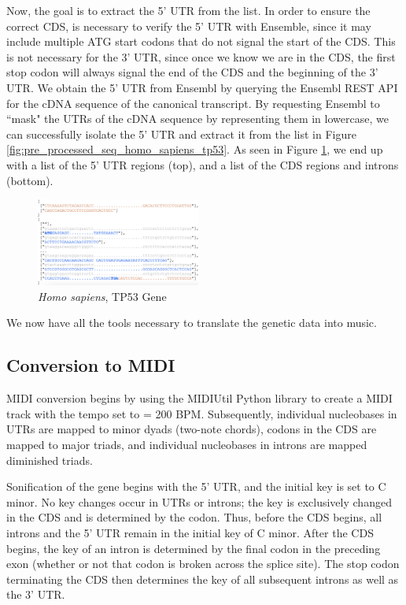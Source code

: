 \documentclass[letterpaper]{article}
\begin{document}
Now, the goal is to extract the 5' UTR from the list. In order to ensure the correct CDS, is necessary to verify the 5' UTR with Ensemble, since it may include multiple ATG start codons that do not signal the start of the CDS. This is not necessary for the 3' UTR, since once we know we are in the CDS, the first stop codon will always signal the end of the CDS and the beginning of the 3' UTR. We obtain the 5' UTR from Ensembl by querying the Ensembl REST API for the cDNA sequence of the canonical transcript. By requesting Ensembl to ``mask" the UTRs of the cDNA sequence by representing them in lowercase, we can successfully isolate the 5' UTR and extract it from the list in Figure \ref{fig:pre_processed_seq_homo_sapiens_tp53}. As seen in Figure \ref{fig:post_processed_seq_homo_sapiens_tp53}, we end up with a list of the 5' UTR regions (top), and a list of the CDS regions and introns (bottom).\cite{10.1162/artl_a_00325}

\begin{figure}[h!]
\centering
\includegraphics[width=0.48\textwidth]{images/post_processed_seq_homo_sapiens_tp53_ABBREV}
\vspace{-3mm}
  \caption{\textit{Homo sapiens}, TP53 Gene}\label{fig:post_processed_seq_homo_sapiens_tp53}
  \vspace{-3mm}
\end{figure}

We now have all the tools necessary to translate the genetic data into music.

\subsection{Conversion to MIDI}

MIDI conversion begins by using the MIDIUtil Python library to create a MIDI track with the tempo set to \musQuarter\;= 200 BPM. Subsequently, individual nucleobases in UTRs are mapped to minor dyads (two-note chords), codons in the CDS are mapped to major triads, and individual nucleobases in introns are mapped diminished triads. 

Sonification of the gene begins with the 5' UTR, and the initial key is set to C minor. No key changes occur in UTRs or introns; the key is exclusively changed in the CDS and is determined by the codon. Thus, before the CDS begins, all introns and the 5' UTR remain in the initial key of C minor. After the CDS begins, the key of an intron is determined by the final codon in the preceding exon (whether or not that codon is broken across the splice site). The stop codon terminating the CDS then determines the key of all subsequent introns as well as the 3' UTR.
\end{document}
